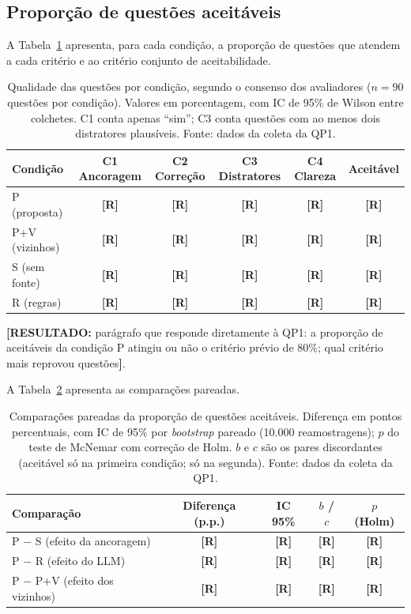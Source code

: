\documentclass[portuguese,oneside]{tcc}
\newcommand{\estr}[1]{\emph{#1}}
\newcommand{\resultado}[1]{\textcolor{red!70!black}{\textbf{[RESULTADO:} #1\textbf{]}}}
\newcommand{\rr}{\textcolor{red!70!black}{\textbf{[R]}}}
\begin{document}
\subsection{Proporção de questões aceitáveis}

A Tabela~\ref{tab:qp1-principal} apresenta, para cada condição, a proporção de questões que atendem a cada critério e ao critério conjunto de aceitabilidade.

\begin{table}[htbp]
\centering
\caption{Qualidade das questões por condição, segundo o consenso dos avaliadores ($n = 90$ questões por condição). Valores em porcentagem, com IC de 95\% de Wilson entre colchetes. C1 conta apenas ``sim''; C3 conta questões com ao menos dois distratores plausíveis. Fonte: dados da coleta da QP1.}
\label{tab:qp1-principal}
\small
\begin{tabular}{lccccc}
\toprule
Condição & C1 Ancoragem & C2 Correção & C3 Distratores & C4 Clareza & Aceitável \\
\midrule
P (proposta) & \rr & \rr & \rr & \rr & \rr \\
P+V (vizinhos) & \rr & \rr & \rr & \rr & \rr \\
S (sem fonte) & \rr & \rr & \rr & \rr & \rr \\
R (regras) & \rr & \rr & \rr & \rr & \rr \\
\bottomrule
\end{tabular}
\end{table}

\resultado{parágrafo que responde diretamente à QP1: a proporção de aceitáveis da condição P atingiu ou não o critério prévio de 80\%; qual critério mais reprovou questões}.

A Tabela~\ref{tab:qp1-comparacoes} apresenta as comparações pareadas.

\begin{table}[htbp]
\centering
\caption{Comparações pareadas da proporção de questões aceitáveis. Diferença em pontos percentuais, com IC de 95\% por \estr{bootstrap} pareado (10.000 reamostragens); $p$ do teste de McNemar com correção de Holm. $b$ e $c$ são os pares discordantes (aceitável só na primeira condição; só na segunda). Fonte: dados da coleta da QP1.}
\label{tab:qp1-comparacoes}
\small
\begin{tabular}{lcccc}
\toprule
Comparação & Diferença (p.p.) & IC 95\% & $b$ / $c$ & $p$ (Holm) \\
\midrule
P $-$ S (efeito da ancoragem) & \rr & \rr & \rr & \rr \\
P $-$ R (efeito do LLM) & \rr & \rr & \rr & \rr \\
P $-$ P+V (efeito dos vizinhos) & \rr & \rr & \rr & \rr \\
\bottomrule
\end{tabular}
\end{table}
\end{document}
